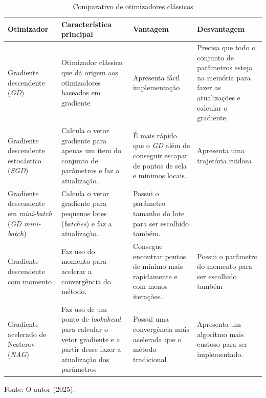 \begin{table}[htbp]
    \centering
    \begin{threeparttable}
        \caption{Comparativo de otimizadores clássicos}
        \label{tab:comparativo-otimizadores-classicos}
        \begin{tabularx}{\textwidth}{p{3.2cm} *{3}{>{\raggedright\arraybackslash}X}}
            \toprule
            \textbf{Otimizador} & \textbf{Característica principal} & \textbf{Vantagem} & \textbf{Desvantagem} \\
            \midrule
            Gradiente descendente (\textit{GD}) & Otimizador clássico que dá origem aos otimizadores baseados em gradiente & Apresenta fácil implementação & Precisa que todo o conjunto de parâmetros esteja na memória para fazer as atualizações e calcular o gradiente. \\
            \addlinespace
            Gradiente descendente estocástico (\textit{SGD}) & Calcula o vetor gradiente para apenas um item do conjunto de parâmetros e faz a atualização. & É mais rápido que o \textit{GD} além de conseguir escapar de pontos de sela e mínimos locais. & Apresenta uma trajetória ruidosa \\
            \addlinespace
            Gradiente descendente em \textit{mini-batch} (\textit{GD mini-batch}) & Calcula o vetor gradiente para pequenos lotes (\textit{batches}) e faz a atualização. & Possui o parámetro tamanho do lote para ser escolhido também. & \\
            \addlinespace
            Gradiente descendente com momento & Faz uso do momento para acelerar a convergência do método. & Consegue encontrar pontos de mínimo mais rapidamente e com menos iterações. & Possui o parâmetro do momento para ser escolhido também \\
            \addlinespace
            Gradiente acelerado de Nesterov (\textit{NAG}) & Faz uso de um ponto de \textit{lookahead} para calcular o vetor gradiente e a partir desse fazer a atualização dos parâmetros & Possui uma convergência mais acelerada que o método tradicional & Apresenta um algoritmo mais custoso para ser implementado. \\
            \bottomrule
        \end{tabularx}
        
        \begin{tablenotes}[para]
            \small
            \item[] Fonte: O autor (2025).
        \end{tablenotes}

    \end{threeparttable}
\end{table}

